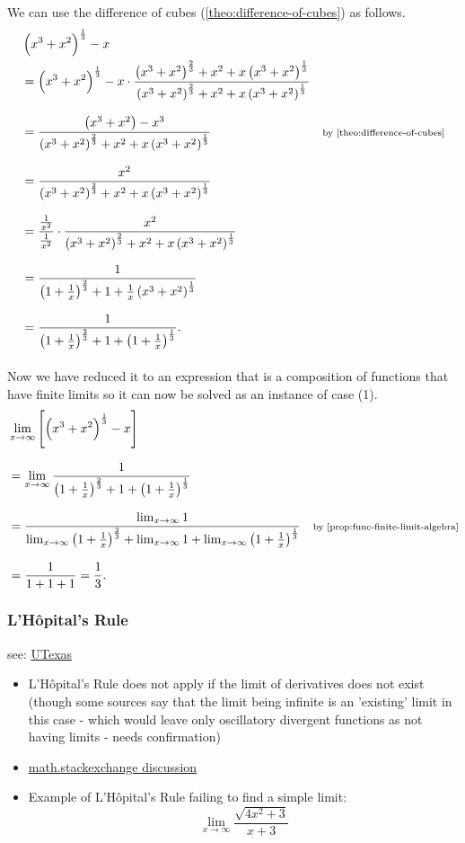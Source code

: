 \documentclass[../MathsNotesBase.tex]{subfiles}
\begin{document}
{\begin{exe}
{				We can use the difference of cubes (\autoref{theo:difference-of-cubes}) as follows.
				\[\begin{aligned}
					&\left(x^3 + x^2\right)^\frac{1}{3} - x \\
					&= \left(x^3 + x^2\right)^\frac{1}{3} - x \cdot \frac{\left(x^3 + x^2\right)^\frac{2}{3} + x^2 + x\left(x^3 + x^2\right)^\frac{1}{3}}{\left(x^3 + x^2\right)^\frac{2}{3} + x^2 + x\left(x^3 + x^2\right)^\frac{1}{3}} \nnn
					&= \frac{\left(x^3 + x^2\right) - x^3}{\left(x^3 + x^2\right)^\frac{2}{3} + x^2 + x\left(x^3 + x^2\right)^\frac{1}{3}} &\sidecomment{by \autoref{theo:difference-of-cubes}}\nnn
					&= \frac{x^2}{\left(x^3 + x^2\right)^\frac{2}{3} + x^2 + x\left(x^3 + x^2\right)^\frac{1}{3}} \nnn
					&= \frac{\frac{1}{x^2}}{\frac{1}{x^2}}\cdot\frac{x^2}{\left(x^3 + x^2\right)^\frac{2}{3} + x^2 + x\left(x^3 + x^2\right)^\frac{1}{3}} \nnn
					&= \frac{1}{\left(1 + \frac{1}{x}\right)^\frac{2}{3} + 1 + \frac{1}{x}\left(x^3 + x^2\right)^\frac{1}{3}} \nnn
					&= \frac{1}{\left(1 + \frac{1}{x}\right)^\frac{2}{3} + 1 + \left(1 + \frac{1}{x}\right)^\frac{1}{3}}. \nnn
				\end{aligned}\]
				Now we have reduced it to an expression that is a composition of functions that have finite limits so it can now be solved as an instance of case (1).
				\[\begin{aligned}
					&\lim_{x\to\infty} \left[\left(x^3 + x^2\right)^\frac{1}{3} - x\right] \nnn
					&= \lim_{x\to\infty} \frac{1}{\left(1 + \frac{1}{x}\right)^\frac{2}{3} + 1 + \left(1 + \frac{1}{x}\right)^\frac{1}{3}} \nnn
					&= \frac{\lim_{x\to\infty} 1}{\lim_{x\to\infty} \left(1 + \frac{1}{x}\right)^\frac{2}{3} + \lim_{x\to\infty} 1 + \lim_{x\to\infty} \left(1 + \frac{1}{x}\right)^\frac{1}{3}} &\sidecomment{by \autoref{prop:func-finite-limit-algebra}} \nnn
					&= \frac{1}{1 + 1 + 1} = \frac{1}{3}.
				\end{aligned}\]
			}
		\end{exe}
	
		\bigskip
		\subsubsection{\texorpdfstring{L'H\^{o}pital's Rule}{L'Hôpital's Rule}}\label{sssection:calc_l_hopitals_rule}
		see: \href{https://web.ma.utexas.edu/users/m408n/m408c/CurrentWeb/LM4-4-11.php}{UTexas}
		\begin{itemize}
			\item{L'H\^{o}pital's Rule does not apply if the limit of derivatives does not exist (though some sources say that the limit being infinite is an 'existing' limit in this case - which would leave only oscillatory divergent functions as not having limits - needs confirmation)}
			\item{\href{https://math.stackexchange.com/questions/1342202/why-doesnt-lhopitals-rule-work-in-this-case/1342222}{math.stackexchange discussion}}
			\item{Example of L'H\^{o}pital's Rule failing to find a simple limit: 
				\[ \lim_{x \to \infty} \frac{ \sqrt{4x^2 + 3} }{ x + 3 } \]
			}
		\end{itemize}
		
}
\end{document}
